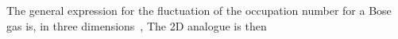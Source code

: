 {		The general expression for the fluctuation of the occupation number for a Bose gas is, in three dimensions~\cite[p.~356]{Landau2},
	The 2D analogue is then
}